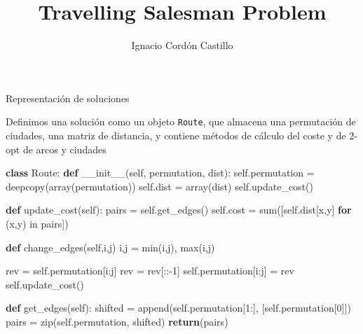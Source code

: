 \documentclass[ignorenonframetext,]{beamer}
\title{Travelling Salesman Problem}
\author{Ignacio Cordón Castillo}
\institute{Doble Grado Matemáticas e Ingeniería Informática, Metaheurísticas, UGR}
\newenvironment{Shaded}{}{}
\newcommand{\KeywordTok}[1]{\textcolor[rgb]{0.00,0.44,0.13}{\textbf{{#1}}}}
\newcommand{\DataTypeTok}[1]{\textcolor[rgb]{0.56,0.13,0.00}{{#1}}}
\newcommand{\DecValTok}[1]{\textcolor[rgb]{0.25,0.63,0.44}{{#1}}}
\newcommand{\OtherTok}[1]{\textcolor[rgb]{0.00,0.44,0.13}{{#1}}}
\newcommand{\NormalTok}[1]{{#1}}
\begin{document}
\begin{frame}
\titlepage
\end{frame}

\begin{frame}[fragile]{Representación de soluciones}

Definimos una solución como un objeto \texttt{Route}, que almacena una
permutación de ciudades, una matriz de distancia, y contiene métodos de
cálculo del coste y de 2-opt de arcos y ciudades

\begin{Shaded}
\begin{Highlighting}[]
\KeywordTok{class} \NormalTok{Route:  }
    \KeywordTok{def} \OtherTok{__init__}\NormalTok{(}\OtherTok{self}\NormalTok{, permutation, dist):}
        \OtherTok{self}\NormalTok{.permutation = deepcopy(array(permutation))}
        \OtherTok{self}\NormalTok{.dist = array(dist)}
        \OtherTok{self}\NormalTok{.update_cost()}

    \KeywordTok{def} \NormalTok{update_cost(}\OtherTok{self}\NormalTok{):}
        \NormalTok{pairs = }\OtherTok{self}\NormalTok{.get_edges()}
        \OtherTok{self}\NormalTok{.cost = }\DataTypeTok{sum}\NormalTok{([}\OtherTok{self}\NormalTok{.dist[x,y] }\KeywordTok{for} \NormalTok{(x,y) in pairs])}

    \KeywordTok{def} \NormalTok{change_edges(}\OtherTok{self}\NormalTok{,i,j)}
        \NormalTok{i,j = }\DataTypeTok{min}\NormalTok{(i,j), }\DataTypeTok{max}\NormalTok{(i,j)}

        \NormalTok{rev = }\OtherTok{self}\NormalTok{.permutation[i:j]}
        \NormalTok{rev = rev[::-}\DecValTok{1}\NormalTok{]}
        \OtherTok{self}\NormalTok{.permutation[i:j] = rev}
        \OtherTok{self}\NormalTok{.update_cost()}

    \KeywordTok{def} \NormalTok{get_edges(}\OtherTok{self}\NormalTok{):}
        \NormalTok{shifted = append(}\OtherTok{self}\NormalTok{.permutation[}\DecValTok{1}\NormalTok{:], [}\OtherTok{self}\NormalTok{.permutation[}\DecValTok{0}\NormalTok{]])}
        \NormalTok{pairs = }\DataTypeTok{zip}\NormalTok{(}\OtherTok{self}\NormalTok{.permutation, shifted)}
        \KeywordTok{return}\NormalTok{(pairs)}
            
\end{Highlighting}
\end{Shaded}

\end{frame}
\end{document}
